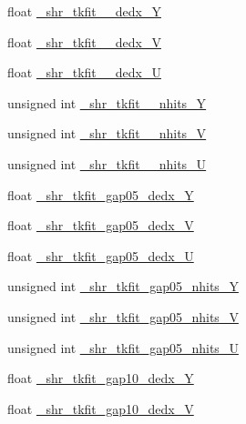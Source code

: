 \begin{DoxyCompactItemize}
\item 
float \hyperlink{classselection_1_1CC0piNpSelection_a3fce1b66b45df22120481d91b16957ba}{\+\_\+shr\+\_\+tkfit\+\_\+2cm\+\_\+dedx\+\_\+Y}
\item 
float \hyperlink{classselection_1_1CC0piNpSelection_a02be9f071fa5ee210e34b5914d428591}{\+\_\+shr\+\_\+tkfit\+\_\+2cm\+\_\+dedx\+\_\+V}
\item 
float \hyperlink{classselection_1_1CC0piNpSelection_a2ae6bb1925bd4f20deb1427c2bde2674}{\+\_\+shr\+\_\+tkfit\+\_\+2cm\+\_\+dedx\+\_\+U}
\item 
unsigned int \hyperlink{classselection_1_1CC0piNpSelection_a267f9073fa07d7c1c5e40b79a935c585}{\+\_\+shr\+\_\+tkfit\+\_\+2cm\+\_\+nhits\+\_\+Y}
\item 
unsigned int \hyperlink{classselection_1_1CC0piNpSelection_a4d79a5a52fba98286c68079f9a3e04cb}{\+\_\+shr\+\_\+tkfit\+\_\+2cm\+\_\+nhits\+\_\+V}
\item 
unsigned int \hyperlink{classselection_1_1CC0piNpSelection_ab659c0c62a77c77e745829478828e100}{\+\_\+shr\+\_\+tkfit\+\_\+2cm\+\_\+nhits\+\_\+U}
\item 
float \hyperlink{classselection_1_1CC0piNpSelection_a82a0f0efca7cceee176b7058001073a6}{\+\_\+shr\+\_\+tkfit\+\_\+gap05\+\_\+dedx\+\_\+Y}
\item 
float \hyperlink{classselection_1_1CC0piNpSelection_a711b325a6f6cb77db530eb21e1c99fc0}{\+\_\+shr\+\_\+tkfit\+\_\+gap05\+\_\+dedx\+\_\+V}
\item 
float \hyperlink{classselection_1_1CC0piNpSelection_ad0504ef7cf7c8fa5a0059fbaedd6861b}{\+\_\+shr\+\_\+tkfit\+\_\+gap05\+\_\+dedx\+\_\+U}
\item 
unsigned int \hyperlink{classselection_1_1CC0piNpSelection_a91054bcbcb38dd0684fe810167c7146f}{\+\_\+shr\+\_\+tkfit\+\_\+gap05\+\_\+nhits\+\_\+Y}
\item 
unsigned int \hyperlink{classselection_1_1CC0piNpSelection_a515d1b21ecb57c0177501823b5ec2568}{\+\_\+shr\+\_\+tkfit\+\_\+gap05\+\_\+nhits\+\_\+V}
\item 
unsigned int \hyperlink{classselection_1_1CC0piNpSelection_a06b5781f09cf3c5129efad982fa3c210}{\+\_\+shr\+\_\+tkfit\+\_\+gap05\+\_\+nhits\+\_\+U}
\item 
float \hyperlink{classselection_1_1CC0piNpSelection_ae4ccdcc53f1b3e72cb360af8af316eb8}{\+\_\+shr\+\_\+tkfit\+\_\+gap10\+\_\+dedx\+\_\+Y}
\item 
float \hyperlink{classselection_1_1CC0piNpSelection_adf21374d01634ceeb71cdcb954c40b98}{\+\_\+shr\+\_\+tkfit\+\_\+gap10\+\_\+dedx\+\_\+V}

\end{DoxyCompactItemize}
